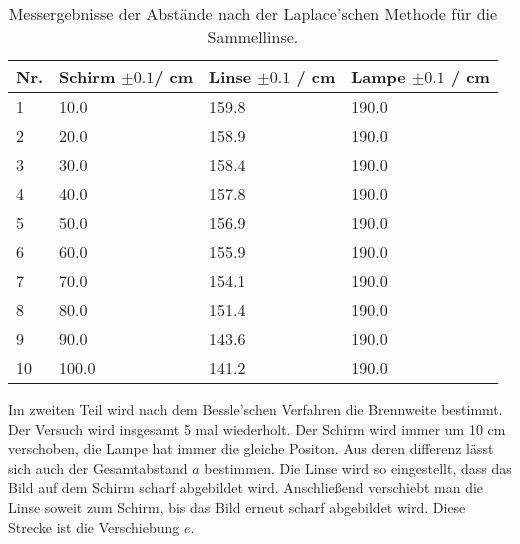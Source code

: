 \documentclass[12pt,a4paper,twoside]{article}
\begin{document}
\begin{table}[H]
    \centering
    \caption{Messergebnisse der Abstände nach der Laplace'schen Methode für die Sammellinse. }
    \label{tab:messergebnisse Laplace}
    \begin{tabular}{| l | l | l | l |}
        \hline
        Nr.  & Schirm $\pm 0.1 $/ cm & Linse $\pm 0.1 $ / cm & Lampe $\pm 0.1 $ / cm \\
        \hline
        1  & 10.0   & 159.8  & 190.0 \\
        2  & 20.0   & 158.9  & 190.0 \\
        3  & 30.0   & 158.4  & 190.0 \\
        4  & 40.0   & 157.8  & 190.0 \\
        5  & 50.0   & 156.9  & 190.0 \\
        6  & 60.0   & 155.9  & 190.0 \\
        7  & 70.0   & 154.1  & 190.0 \\
        8  & 80.0   & 151.4  & 190.0 \\
        9  & 90.0   & 143.6  & 190.0 \\
        10 & 100.0  & 141.2  & 190.0 \\
        \hline
    \end{tabular}
\end{table}

\noindent
Im zweiten Teil wird nach dem Bessle'schen Verfahren die Brennweite bestimmt. 
Der Versuch wird insgesamt 5 mal wiederholt. Der Schirm wird immer um 10 cm verschoben, die Lampe hat immer die gleiche Positon. Aus deren differenz lässt sich auch der Gesamtabstand $a$ bestimmen. 
Die Linse wird so eingestellt, dass das Bild auf dem Schirm scharf abgebildet wird. Anschließend verschiebt man die Linse soweit zum Schirm, bis das Bild erneut scharf abgebildet wird. Diese Strecke ist die Verschiebung $e$. 
\end{document}
